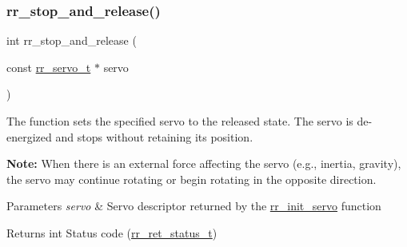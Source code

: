 \subsubsection{\texorpdfstring{rr\+\_\+stop\+\_\+and\+\_\+release()}{rr\_stop\_and\_release()}}
{\footnotesize\ttfamily int rr\+\_\+stop\+\_\+and\+\_\+release (\begin{DoxyParamCaption}\item[{const \hyperlink{structrr__servo__t}{rr\+\_\+servo\+\_\+t} $\ast$}]{servo }\end{DoxyParamCaption})}



The function sets the specified servo to the released state. The servo is de-\/energized and stops without retaining its position. 

{\bfseries Note\+:} When there is an external force affecting the servo (e.\+g., inertia, gravity), the servo may continue rotating or begin rotating in the opposite direction.


\begin{DoxyParams}{Parameters}
{\em servo} & Servo descriptor returned by the \hyperlink{group___init_ga0adb313a3eeb8a4399431e940a1f3e9e}{rr\+\_\+init\+\_\+servo} function \\
\hline
\end{DoxyParams}
\begin{DoxyReturn}{Returns}
int Status code (\hyperlink{api_8h_a92d5be5038abcf89837faf85a08debdc}{rr\+\_\+ret\+\_\+status\+\_\+t}) 
\end{DoxyReturn}
